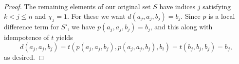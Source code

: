\begin{proof}
The remaining elements of our original set $S$
have indices $j$ satisfying $k<j\leq n$ and $\chi_j = 1$.
For these we want $d(a_j,a_j,b_j) = b_j$.
Since $p$ is a local difference term for $S'$, we have
$p(a_j,a_j,b_j) = b_j$, and this along with idempotence of $t$ yields
\begin{equation*}
d(a_j,a_j,b_j) =
  t(p(a_j,a_j,b_j), p(a_j,a_j,b_j), b_i)=
  t(b_j, b_j, b_j) =b_j,
\end{equation*}
as desired.
\end{proof}
